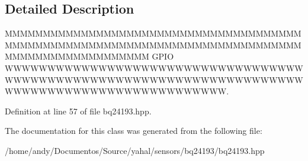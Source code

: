 \subsection{Detailed Description}
M\+M\+M\+M\+M\+M\+M\+M\+M\+M\+M\+M\+M\+M\+M\+M\+M\+M\+M\+M\+M\+M\+M\+M\+M\+M\+M\+M\+M\+M\+M\+M\+M\+M\+M\+M\+M\+M\+M\+M\+M\+M\+M\+M\+M\+M\+M\+M\+M\+M\+M\+M\+M\+M\+M\+M\+M\+M\+M\+M\+M\+M\+M\+M\+M\+M\+M\+M\+M\+M\+M\+M\+M\+M\+M\+M\+M\+M\+M\+M\+M\+M\+M\+M\+M\+M\+M\+M\+M\+M\+M\+M\+M\+M\+M\+M\+M G\+P\+I\+O W\+W\+W\+W\+W\+W\+W\+W\+W\+W\+W\+W\+W\+W\+W\+W\+W\+W\+W\+W\+W\+W\+W\+W\+W\+W\+W\+W\+W\+W\+W\+W\+W\+W\+W\+W\+W\+W\+W\+W\+W\+W\+W\+W\+W\+W\+W\+W\+W\+W\+W\+W\+W\+W\+W\+W\+W\+W\+W\+W\+W\+W\+W\+W\+W\+W\+W\+W\+W\+W\+W\+W\+W\+W\+W\+W\+W\+W\+W\+W\+W\+W\+W\+W\+W\+W\+W\+W\+W\+W\+W\+W\+W\+W\+W\+W. 

Definition at line 57 of file bq24193.\+hpp.



The documentation for this class was generated from the following file\+:\begin{DoxyCompactItemize}
\item 
/home/andy/\+Documentos/\+Source/yahal/sensors/bq24193/bq24193.\+hpp\end{DoxyCompactItemize}
